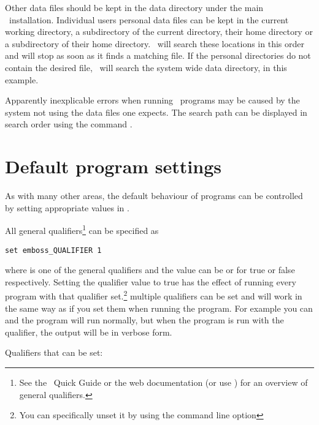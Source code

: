\documentclass{report}
\begin{document}
Other data files should be kept in the data directory under the main \EMBOSS\ installation. Individual users personal data files can be kept in the current working directory, a subdirectory  of the current directory, their home directory or a subdirectory  of their home directory. \EMBOSS\ will search these locations in this order and will stop as soon as it finds a matching file. If the personal directories do not contain the desired file, \EMBOSS\ will search the system wide data directory,  in this example.

Apparently inexplicable errors when running \EMBOSS\ programs may be caused by the system not using the data files one expects. The search path can be displayed in search order using the command .

\section{Default program settings}

As with many other areas, the default behaviour of programs can be controlled by setting appropriate values in .

All general qualifiers\footnote{See the \EMBOSS\ Quick Guide or the web documentation (or use ) for an overview of general qualifiers.} can be specified as
\begin{verbatim}
set emboss_QUALIFIER 1
\end{verbatim} 
where  is one of the general qualifiers and the value can be  or  for true or false respectively. Setting the qualifier value to true has the effect of running every program with that qualifier set.\footnote{You can specifically unset it by using the  command line option} multiple qualifiers can be set and will work in the same way as if you set them when running the program. For example you can  and the program will run normally, but when the program is run with the  qualifier, the output will be in verbose form.

Qualifiers that can be set:
\end{document}
